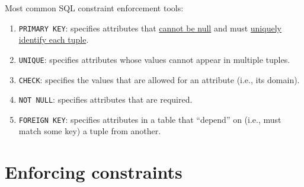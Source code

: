 \documentclass[xcolor={usenames,dvipsnames}]{beamer}
\begin{document}
%
%

\begin{frame}

Most common SQL constraint enforcement tools:

\begin{enumerate}[(1),noitemsep]
\item \lstinline[style=SQL]{PRIMARY KEY}: specifies attributes that \underline{cannot be null} and must \underline{uniquely identify each tuple}.
\item \lstinline[style=SQL]{UNIQUE}: specifies attributes whose values cannot appear in multiple tuples.
\item \lstinline[style=SQL]{CHECK}: specifies the values that are allowed for an attribute (i.e., its domain).
\item \lstinline[style=SQL]{NOT NULL}: specifies attributes that are required.
\item \lstinline[style=SQL]{FOREIGN KEY}: specifies attributes in a table that ``depend'' on (i.e., must match some key)  a tuple from another.
\end{enumerate}

\end{frame}


%
%



%
%

\begin{frame} %
\label{movie_instance}
\vskip1em
\usebox{\FullInstance}
\end{frame} %



\section{Enforcing constraints}
\end{document}
